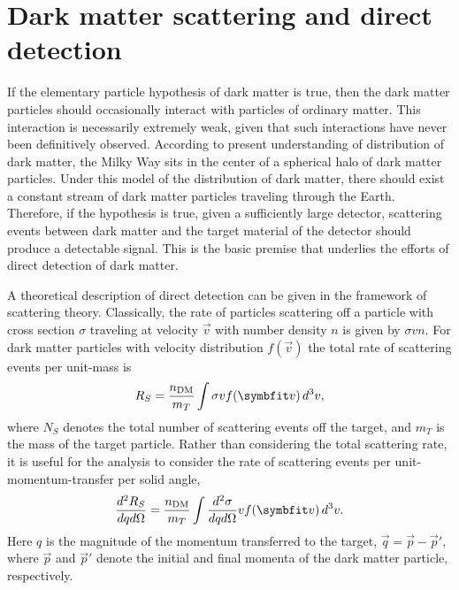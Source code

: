 \chapter{Dark matter scattering and direct detection}
\label{chap:direct-detection}

If the elementary particle hypothesis of dark matter is true, then the dark matter particles should occasionally interact with particles of ordinary matter. This interaction is necessarily extremely weak, given that such interactions have never been definitively observed. According to present understanding of distribution of dark matter, the Milky Way sits in the center of a spherical halo of dark matter particles. Under this model of the distribution of dark matter, there should exist a constant stream of dark matter particles traveling through the Earth. Therefore, if the hypothesis is true, given a sufficiently large detector, scattering events between dark matter and the target material of the detector should produce a detectable signal. This is the basic premise that underlies the efforts of direct detection of dark matter.

A theoretical description of direct detection can be given in the framework of scattering theory. Classically, the rate of particles scattering off a particle with cross section $\sigma$ traveling at velocity $\vec{v}$ with number density $n$ is given by $\sigma vn$. For dark matter particles with velocity distribution $f(\vec{v})$ the total rate of scattering events per unit-mass is
\begin{equation}
    R_S=\frac{n_\text{DM}}{m_T}\int\sigma vf(\vec{v})\difd^3v,
\end{equation}
where $N_S$ denotes the total number of scattering events off the target, and $m_T$ is the mass of the target particle. Rather than considering the total scattering rate, it is useful for the analysis to consider the rate of scattering events per unit-momentum-transfer per solid angle,
\begin{equation}
    \ddder{R_S}{q}{\Omega}=\frac{n_\text{DM}}{m_T}\int\ddder{\sigma}{q}{\Omega}vf(\vec{v})\difd^3{v}.
\end{equation}
Here $q$ is the magnitude of the momentum transferred to the target, $\vec{q}=\vec{p}-\vec{p}'$, where $\vec{p}$ and $\vec{p}'$ denote the initial and final momenta of the dark matter particle, respectively.

